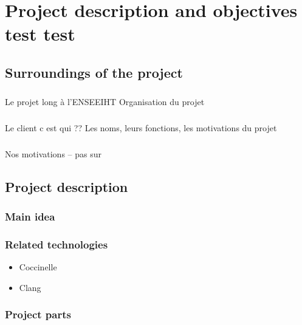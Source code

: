 \documentclass{report}
\begin{document}
\chapter{Project description and objectives test test}

\section{Surroundings of the project}

\paragraph{}
\hspace{4mm}\textnormal{Le projet long \`{a} l'ENSEEIHT
	Organisation du projet}

\paragraph{}
\hspace{4mm}\textnormal{Le client c est qui ?? Les noms, leurs fonctions, les motivations du projet}

\paragraph{}
\hspace{4mm}\textnormal{Nos motivations -- pas sur}

\section{Project description}

\subsection{Main idea}

\subsection{Related technologies}

\vspace{4mm}
\begin{itemize}
\item Coccinelle\vspace{1mm}
\item Clang\vspace{1mm}
\end{itemize}

\subsection{Project parts}
\end{document}
